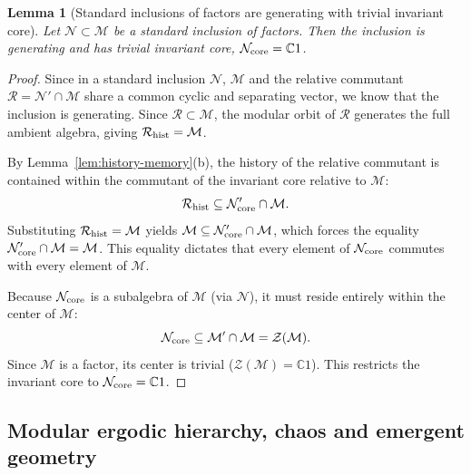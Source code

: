 \documentclass[a4paper,11pt]{article}
\newtheorem{lemma}[theorem]{Lemma}
\theoremstyle{definition}
\newcommand{\mR}{\mathcal{R}}
\newcommand{\mN}{\mathcal{N}}
\newcommand{\mM}{\mathcal{M}}
\begin{document}
\begin{lemma}[Standard inclusions of factors are generating with trivial invariant core]
\label{lem:standard-forgetful}
Let $\mN \subset \mM$ be a standard inclusion of factors. Then the inclusion is generating and has trivial invariant core, $\mN_{\rm core} = \mathbb C1$.
\end{lemma}
\begin{proof}
Since in a standard inclusion $\mN$, $\mM$ and the relative commutant $\mR = \mN' \cap \mM$ share a common cyclic and separating vector, we know that the inclusion is generating. Since $\mR \subset \mM$, the modular orbit of $\mR$ generates the full ambient algebra, giving $\mR_{\rm hist} = \mM$.

By Lemma~\ref{lem:history-memory}(b), the history of the relative commutant is contained within the commutant of the invariant core relative to $\mM$:
\begin{equation}
    \mR_{\rm hist} \subseteq \mN_{\rm core}' \cap \mM.
\end{equation}
Substituting $\mR_{\rm hist} = \mM$ yields $\mM \subseteq \mN_{\rm core}' \cap \mM$, which forces the equality $\mN_{\rm core}' \cap \mM = \mM$. This equality dictates that every element of $\mN_{\rm core}$ commutes with every element of $\mM$.

Because $\mN_{\rm core}$ is a subalgebra of $\mM$ (via $\mN$), it must reside entirely within the center of $\mM$:
\begin{equation}
    \mN_{\rm core} \subseteq \mM' \cap \mM = \mathcal Z(\mM).
\end{equation}
Since $\mM$ is a factor, its center is trivial ($\mathcal Z(\mM) = \mathbb C1$). This restricts the invariant core to $\mN_{\rm core} = \mathbb C1$.
\end{proof}

\subsection{Modular ergodic hierarchy, chaos and emergent geometry}\label{subsec:QEC-hierarchy}\label{subsec:geometry-modular-ergodic}\label{subsec:geometry-K-systems}
\end{document}
